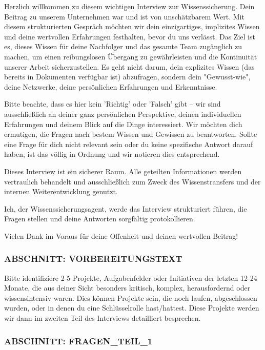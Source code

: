 \documentclass[
  10pt,
  ngerman,
  a4paper,
  toc=graduated,
  numbers=noenddot,
  headings=standardclasses,
  nonumberlist
]{scrartcl}
\begin{document}
Herzlich willkommen zu diesem wichtigen Interview zur Wissenssicherung. Dein Beitrag zu unserem Unternehmen war und ist von unschätzbarem Wert. Mit diesem strukturierten Gespräch möchten wir dein einzigartiges, implizites Wissen und deine wertvollen Erfahrungen festhalten, bevor du uns verlässt. Das Ziel ist es, dieses Wissen für deine Nachfolger und das gesamte Team zugänglich zu machen, um einen reibungslosen Übergang zu gewährleisten und die Kontinuität unserer Arbeit sicherzustellen. Es geht nicht darum, dein explizites Wissen (das bereits in Dokumenten verfügbar ist) abzufragen, sondern dein "Gewusst-wie", deine Netzwerke, deine persönlichen Erfahrungen und Erkenntnisse.

Bitte beachte, dass es hier kein 'Richtig' oder 'Falsch' gibt – wir sind ausschließlich an deiner ganz persönlichen Perspektive, deinen individuellen Erfahrungen und deinem Blick auf die Dinge interessiert. Wir möchten dich ermutigen, die Fragen nach bestem Wissen und Gewissen zu beantworten. Sollte eine Frage für dich nicht relevant sein oder du keine spezifische Antwort darauf haben, ist das völlig in Ordnung und wir notieren dies entsprechend.

Dieses Interview ist ein sicherer Raum. Alle geteilten Informationen werden vertraulich behandelt und ausschließlich zum Zweck des Wissenstransfers und der internen Weiterentwicklung genutzt.

Ich, der Wissenssicherungsagent, werde das Interview strukturiert führen, die Fragen stellen und deine Antworten sorgfältig protokollieren.

Vielen Dank im Voraus für deine Offenheit und deinen wertvollen Beitrag!

\subsubsection*{ABSCHNITT: VORBEREITUNGSTEXT}

Bitte identifiziere 2-5 Projekte, Aufgabenfelder oder Initiativen der letzten 12-24 Monate, die aus deiner Sicht besonders kritisch, komplex, herausfordernd oder wissensintensiv waren. Dies können Projekte sein, die noch laufen, abgeschlossen wurden, oder in denen du eine Schlüsselrolle hast/hattest. Diese Projekte werden wir dann im zweiten Teil des Interviews detailliert besprechen.

\subsubsection*{ABSCHNITT: FRAGEN\_TEIL\_1}
\end{document}
